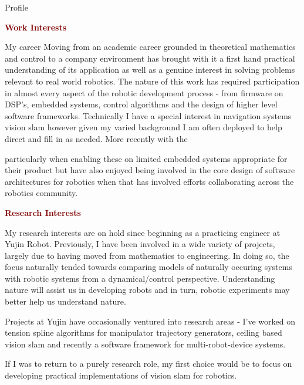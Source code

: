 \documentclass[a4paper,10pt]{article}
\begin{document}
\begin{cvsection}{Profile}
  \vspace{-1.2em}

  \textcolor{maroon}{\textbf{Work Interests}}

  My career Moving from an academic career grounded in theoretical mathematics and control to a company environment has brought with it a first hand practical understanding of its application as well as a genuine interest in solving problems relevant to real world robotics. The nature of this work has required participation in almost every aspect of the robotic development process - from firmware on DSP's, embedded systems, control algorithms and the design of higher level software frameworks. Technically I have a special interest in navigation systems vision slam however given my varied background I am often deployed to help direct and fill in as needed. More recently with the 
  
  particularly when enabling these on limited embedded systems appropriate for their product but have also enjoyed being involved in the core design of software architectures for robotics when that has involved efforts collaborating across the robotics community.

\textcolor{maroon}{\textbf{Research Interests}}

My research interests are on hold since beginning as a practicing engineer at Yujin Robot. Previously, I have been involved in a wide variety of projects, largely due to having moved from mathematics to engineering. In doing so, the focus naturally tended towards comparing models of naturally occuring systems with robotic systems from a dynamical/control perspective. Understanding nature will assist us in developing robots and in turn, robotic experiments may better help us understand nature. 

Projects at Yujin have occasionally ventured into research areas - I've worked on tension spline algorithms for manipulator trajectory generators, ceiling based vision slam and recently a software framework for multi-robot-device systems.

If I was to return to a purely research role, my first choice would be to focus on developing practical implementations of vision slam for robotics.

\end{cvsection}
\end{document}
